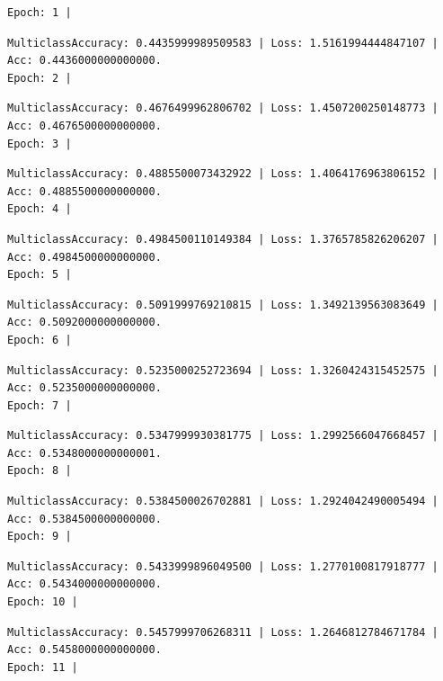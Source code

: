 \documentclass[
  letterpaper,
  DIV=11,
  numbers=noendperiod]{scrreprt}
\begin{document}
\begin{verbatim}
Epoch: 1 | 
\end{verbatim}

\begin{verbatim}
MulticlassAccuracy: 0.4435999989509583 | Loss: 1.5161994444847107 | Acc: 0.4436000000000000.
Epoch: 2 | 
\end{verbatim}

\begin{verbatim}
MulticlassAccuracy: 0.4676499962806702 | Loss: 1.4507200250148773 | Acc: 0.4676500000000000.
Epoch: 3 | 
\end{verbatim}

\begin{verbatim}
MulticlassAccuracy: 0.4885500073432922 | Loss: 1.4064176963806152 | Acc: 0.4885500000000000.
Epoch: 4 | 
\end{verbatim}

\begin{verbatim}
MulticlassAccuracy: 0.4984500110149384 | Loss: 1.3765785826206207 | Acc: 0.4984500000000000.
Epoch: 5 | 
\end{verbatim}

\begin{verbatim}
MulticlassAccuracy: 0.5091999769210815 | Loss: 1.3492139563083649 | Acc: 0.5092000000000000.
Epoch: 6 | 
\end{verbatim}

\begin{verbatim}
MulticlassAccuracy: 0.5235000252723694 | Loss: 1.3260424315452575 | Acc: 0.5235000000000000.
Epoch: 7 | 
\end{verbatim}

\begin{verbatim}
MulticlassAccuracy: 0.5347999930381775 | Loss: 1.2992566047668457 | Acc: 0.5348000000000001.
Epoch: 8 | 
\end{verbatim}

\begin{verbatim}
MulticlassAccuracy: 0.5384500026702881 | Loss: 1.2924042490005494 | Acc: 0.5384500000000000.
Epoch: 9 | 
\end{verbatim}

\begin{verbatim}
MulticlassAccuracy: 0.5433999896049500 | Loss: 1.2770100817918777 | Acc: 0.5434000000000000.
Epoch: 10 | 
\end{verbatim}

\begin{verbatim}
MulticlassAccuracy: 0.5457999706268311 | Loss: 1.2646812784671784 | Acc: 0.5458000000000000.
Epoch: 11 | 
\end{verbatim}
\end{document}
